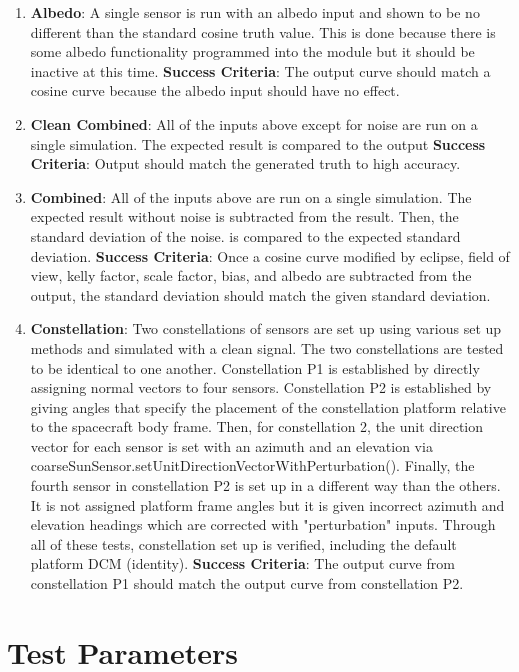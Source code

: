 \begin{enumerate}
	\item\textbf{Albedo}: A single sensor is run with an albedo input and shown to be no different than the standard cosine truth value. This is done because there is some albedo functionality programmed into the module but it should be inactive at this time.
	\subitem \textbf{Success Criteria}: The output curve should match a cosine curve because the albedo input should have no effect.
	\item\textbf{Clean Combined}: All of the inputs above except for noise are run on a single simulation. The expected result is compared to the output
	\subitem \textbf{Success Criteria}: Output should match the generated truth to high accuracy.
	\item\textbf{Combined}: All of the inputs above are run on a single simulation. The expected result without noise is subtracted from the result. Then, the standard deviation of the noise. is compared to the expected standard deviation.
	\subitem \textbf{Success Criteria}: Once a cosine curve modified by eclipse, field of view, kelly factor, scale factor, bias, and albedo are subtracted from the output, the standard deviation should match the given standard deviation.
	\item\textbf{Constellation}: Two constellations of sensors are set up using various set up methods and simulated with a clean signal. The two constellations are tested to be identical to one another. Constellation P1 is established by directly assigning normal vectors to four sensors. Constellation P2 is established by giving angles that specify the placement of the constellation platform relative to the spacecraft body frame. Then, for constellation 2, the unit direction vector for each sensor is set with an azimuth and an elevation via coarseSunSensor.setUnitDirectionVectorWithPerturbation(). Finally, the fourth sensor in constellation P2 is set up in a different way than the others. It is not assigned platform frame angles but it is given incorrect azimuth and elevation headings which are corrected with "perturbation" inputs. Through all of these tests, constellation set up is verified, including the default platform DCM (identity).
	\subitem \textbf{Success Criteria}: The output curve from constellation P1 should match the output curve from constellation P2.
\end{enumerate}


\section{Test Parameters}

